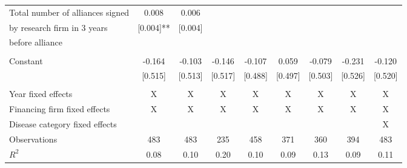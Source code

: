 \begin{tabular}{lcccccccc}
\\
Total number of alliances signed&0.008&0.006\\
\quad by research firm in 3 years&[0.004]**&[0.004] \\
\quad before alliance \\
\\
Constant&-0.164 &-0.103 &-0.146 &-0.107 &0.059 &-0.079 &-0.231 &-0.120  \\
&[0.515]& [0.513] &[0.517] &[0.488]& [0.497] &[0.503]& [0.526]& [0.520]\\
\\
Year fixed effects&X& X& X &X& X& X& X& X \\
Financing firm fixed effects&X& X& X &X& X& X& X& X\\
Disease category fixed effects&&&&&&&&X\\
Observations&483& 483& 235 &458 &371 &360 &394 &483\\
$R^2$&0.08& 0.10 &0.20 &0.10 &0.09 &0.13 &0.09 &0.11

\\ \hline


\end{tabular}
